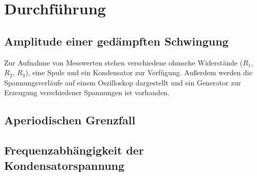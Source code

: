 \section{Durchführung}
\label{sec:Durchführung}


\subsection{Amplitude einer gedämpften Schwingung}
Zur Aufnahme von Messwerten stehen verschiedene ohmsche Widerstände ($R_1$, $R_2$, $R_3$),
 eine Spule und ein Kondensator zur Verfügung. Außerdem werden die Spannungsverläufe 
 auf einem Oszilloskop dargestellt und ein Generator zur Erzeugung verschiedener 
 Spannungen ist vorhanden. 
\subsection{Aperiodischen Grenzfall}
\subsection{Frequenzabhängigkeit der Kondensatorspannung}